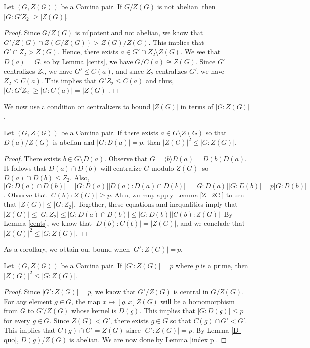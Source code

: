\begin{lemma} \label{Z_2G'}
Let $(G,Z (G))$ be a Camina pair.  If $G/Z (G)$ is not abelian, then $|G: G' Z_2| \ge |Z (G)|$.
\end{lemma}

\begin{proof}
Since $G/Z (G)$ is nilpotent and not abelian, we know that $G'/Z (G) \cap Z(G/Z (G)) > Z (G)/Z (G)$.  This implies that $G' \cap Z_2 > Z (G)$.  Hence, there exists $a \in G' \cap Z_2 \setminus Z(G)$.  We see that $D (a) = G$, so by Lemma \ref{cents}, we have $G/C (a) \cong Z (G)$.  Since $G'$ centralizes $Z_2$, we have $G' \le C (a)$, and since $Z_2$ centralizes $G'$, we have $Z_2 \le C (a)$.  This implies that $G' Z_2 \le C (a)$ and thus, $|G:G' Z_2| \ge |G:C (a)| = |Z (G)|$.
\end{proof}

We now use a condition on centralizers to bound $|Z(G)|$ in terms of $|G:Z (G)|$.

\begin{lemma} \label{index p}
Let $(G,Z (G))$ be a Camina pair.  If there exists $a \in G \setminus Z (G)$ so that $D (a)/Z (G)$ is abelian and $|G:D (a)| = p$, then $|Z (G)|^2 \le |G:Z (G)|$.
\end{lemma}

\begin{proof}
There exists $b \in G \setminus D (a)$.  Observe that $G = \langle b \rangle D (a) = D (b) D (a)$.  It follows that $D (a) \cap D (b)$ will centralize $G$ modulo $Z(G)$, so $D (a) \cap D (b) \le Z_2$.  Also, $|G:D (a) \cap D (b)| = |G:D (a)||D (a):D (a) \cap D (b)| = |G:D (a)||G:D (b)| = p|G:D (b)|$.  Observe that $|C (b):Z (G)| \ge p$.  Also, we may apply Lemma \ref{Z_2G'} to see that $|Z (G)| \le |G:Z_2|$.  Together, these equations and inequalities imply that $|Z (G)| \le |G:Z_2| \le |G:D (a) \cap D (b)| \le |G:D (b)||C (b):Z (G)|$.  By Lemma \ref{cents}, we know that $|D (b):C (b)| = |Z (G)|$, and we conclude that $|Z (G)|^2 \le |G:Z (G)|$.
\end{proof}

As a corollary, we obtain our bound when $|G':Z (G)| = p$.

\begin{corollary}
Let $(G,Z (G))$ be a Camina pair.  If $|G':Z (G)| = p$ where $p$ is a prime, then $|Z (G)|^2 \le |G:Z (G)|$.
\end{corollary}

\begin{proof}
Since $|G':Z (G)| = p$, we know that $G'/Z (G)$ is central in $G/Z (G)$.  For any element $g \in G$, the map $x \mapsto [g,x]Z(G)$ will be a homomorphism from $G$ to $G'/Z(G)$ whose kernel is $D (g)$.  This implies that $|G:D (g)| \le p$ for every $g \in G$.  Since $Z (G) < G'$, there exists $g \in G$ so that $C (g) \cap G' < G'$.  This implies that $C (g) \cap G' = Z (G)$ since $|G': Z(G)| = p$.  By Lemma \ref{D-quo}, $D (g)/Z(G)$ is abelian.  We are now done by Lemma \ref{index p}.
\end{proof}

